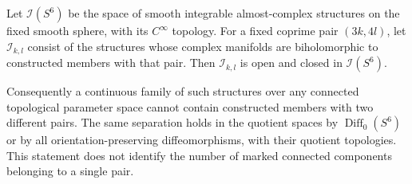 \begin{corollary}
Let $\mathcal I(S^6)$ be the space of smooth integrable
almost-complex structures on the fixed smooth sphere,
with its $C^\infty$ topology.  For a fixed coprime pair
$(3k,4l)$, let $\mathcal I_{k,l}$ consist of the structures
whose complex manifolds are biholomorphic to constructed
members with that pair.  Then $\mathcal I_{k,l}$ is open
and closed in $\mathcal I(S^6)$.

Consequently a continuous family of such structures
over any connected topological parameter space cannot
contain constructed members with two different pairs.
The same separation holds in the quotient spaces by
$\operatorname{Diff}_0(S^6)$ or by all orientation-preserving
diffeomorphisms, with their quotient topologies.
This statement does not identify the number of marked
connected components belonging to a single pair.
\end{corollary}
